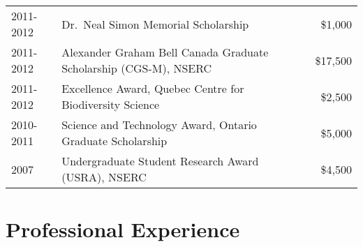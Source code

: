 \documentclass[12pt]{article}
\begin{document}
\begin{tabular}{llr}
  2011-2012 & Dr.\ Neal Simon Memorial Scholarship & \$1,000\\
  2011-2012 & Alexander Graham Bell Canada Graduate Scholarship (CGS-M), NSERC & \$17,500\\
  2011-2012 & Excellence Award, Quebec Centre for Biodiversity Science & \$2,500\\
  2010-2011 & Science and Technology Award, Ontario Graduate Scholarship & \$5,000\\
  2007 & Undergraduate Student Research Award (USRA), NSERC & \$4,500\\
\end{tabular}

\section*{Professional Experience}
\end{document}
